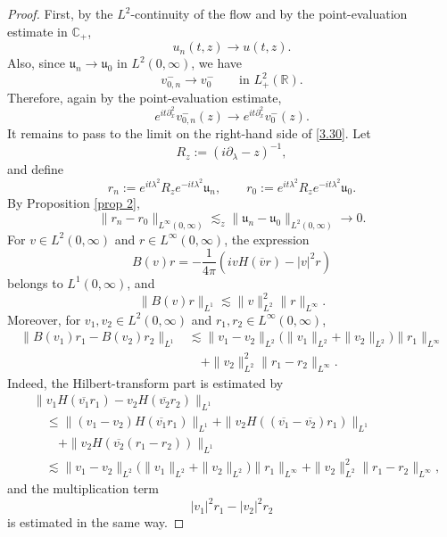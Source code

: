 \documentclass[10pt]{article}
\numberwithin{equation}{section}
\numberwithin{theorem}{section}
\begin{document}
\begin{proof}
First, by the \(L^2\)-continuity of the flow and by the point-evaluation estimate
in \(\mathbb C_+\),
\begin{equation}
\label{3.31}
u_n(t,z)\to u(t,z).
\end{equation}
Also, since \(\mathfrak u_n\to\mathfrak u_0\) in \(L^2(0,\infty)\), we have
\[
v_{0,n}^-\to v_0^-
\qquad\text{in }L^2_+(\mathbb R).
\]
Therefore, again by the point-evaluation estimate,
\begin{equation}
\label{3.32}
e^{it\partial_x^2}v_{0,n}^-(z)
\to
e^{it\partial_x^2}v_0^-(z).
\end{equation}
It remains to pass to the limit on the right-hand side of \eqref{3.30}. Let
\[
R_z:=(i\partial_\lambda-z)^{-1},
\]
and define
\[
r_n
:=
e^{it\lambda^2}R_z e^{-it\lambda^2}\mathfrak u_n,
\qquad
r_0
:=
e^{it\lambda^2}R_z e^{-it\lambda^2}\mathfrak u_0.
\]
By Proposition \ref{prop 2},
\begin{equation}
\label{3.33}
\|r_n-r_0\|_{L^\infty(0,\infty)}
\lesssim_z
\|\mathfrak u_n-\mathfrak u_0\|_{L^2(0,\infty)}
\to0.
\end{equation}
For \(v\in L^2(0,\infty)\) and \(r\in L^\infty(0,\infty)\), the expression
\[
B(v)r
=
-\frac1{4\pi}
\left(
ivH(\overline vr)-|v|^2r
\right)
\]
belongs to \(L^1(0,\infty)\), and
\begin{equation}
\label{3.34}
\|B(v)r\|_{L^1}
\lesssim
\|v\|_{L^2}^2\|r\|_{L^\infty}.
\end{equation}
Moreover, for \(v_1,v_2\in L^2(0,\infty)\) and
\(r_1,r_2\in L^\infty(0,\infty)\),
\begin{equation}
\label{3.35}
\begin{aligned}
\|B(v_1)r_1-B(v_2)r_2\|_{L^1}
&\lesssim
\|v_1-v_2\|_{L^2}
\bigl(\|v_1\|_{L^2}+\|v_2\|_{L^2}\bigr)
\|r_1\|_{L^\infty}  \\
&\quad
+
\|v_2\|_{L^2}^2\|r_1-r_2\|_{L^\infty}.
\end{aligned}
\end{equation}
Indeed, the Hilbert-transform part is estimated by
\[
\begin{aligned}
&\|v_1H(\overline{v_1}r_1)-v_2H(\overline{v_2}r_2)\|_{L^1} \\
&\quad\le
\|(v_1-v_2)H(\overline{v_1}r_1)\|_{L^1}
+
\|v_2H((\overline{v_1}-\overline{v_2})r_1)\|_{L^1} \\
&\qquad
+
\|v_2H(\overline{v_2}(r_1-r_2))\|_{L^1}  \\
&\quad\lesssim
\|v_1-v_2\|_{L^2}
\bigl(\|v_1\|_{L^2}+\|v_2\|_{L^2}\bigr)
\|r_1\|_{L^\infty}
+
\|v_2\|_{L^2}^2
\|r_1-r_2\|_{L^\infty},
\end{aligned}
\]
and the multiplication term
\[
|v_1|^2r_1-|v_2|^2r_2
\]
is estimated in the same way.


\end{proof}
\end{document}
